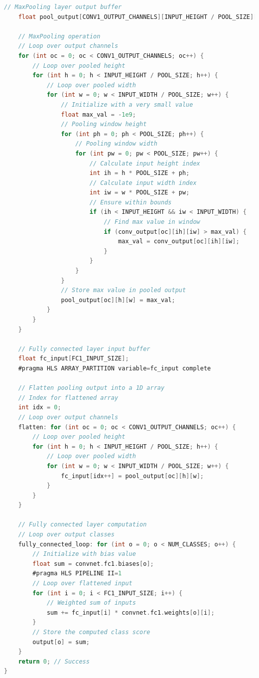 \documentclass{article}
\begin{document}
\begin{lstlisting}[language=C]
    // MaxPooling layer output buffer
    float pool_output[CONV1_OUTPUT_CHANNELS][INPUT_HEIGHT / POOL_SIZE][INPUT_WIDTH / POOL_SIZE];

    // MaxPooling operation
    // Loop over output channels
    for (int oc = 0; oc < CONV1_OUTPUT_CHANNELS; oc++) { 
        // Loop over pooled height
        for (int h = 0; h < INPUT_HEIGHT / POOL_SIZE; h++) { 
            // Loop over pooled width
            for (int w = 0; w < INPUT_WIDTH / POOL_SIZE; w++) { 
                // Initialize with a very small value
                float max_val = -1e9; 
                // Pooling window height
                for (int ph = 0; ph < POOL_SIZE; ph++) { 
                    // Pooling window width
                    for (int pw = 0; pw < POOL_SIZE; pw++) { 
                        // Calculate input height index
                        int ih = h * POOL_SIZE + ph; 
                        // Calculate input width index
                        int iw = w * POOL_SIZE + pw; 
                        // Ensure within bounds
                        if (ih < INPUT_HEIGHT && iw < INPUT_WIDTH) { 
                            // Find max value in window
                            if (conv_output[oc][ih][iw] > max_val) { 
                                max_val = conv_output[oc][ih][iw];
                            }
                        }
                    }
                }
                // Store max value in pooled output
                pool_output[oc][h][w] = max_val; 
            }
        }
    }

    // Fully connected layer input buffer
    float fc_input[FC1_INPUT_SIZE];
    #pragma HLS ARRAY_PARTITION variable=fc_input complete

    // Flatten pooling output into a 1D array
    // Index for flattened array
    int idx = 0; 
    // Loop over output channels
    flatten: for (int oc = 0; oc < CONV1_OUTPUT_CHANNELS; oc++) { 
        // Loop over pooled height
        for (int h = 0; h < INPUT_HEIGHT / POOL_SIZE; h++) { 
            // Loop over pooled width
            for (int w = 0; w < INPUT_WIDTH / POOL_SIZE; w++) { 
                fc_input[idx++] = pool_output[oc][h][w];
            }
        }
    }

    // Fully connected layer computation
    // Loop over output classes
    fully_connected_loop: for (int o = 0; o < NUM_CLASSES; o++) { 
        // Initialize with bias value
        float sum = convnet.fc1.biases[o]; 
        #pragma HLS PIPELINE II=1
        // Loop over flattened input
        for (int i = 0; i < FC1_INPUT_SIZE; i++) { 
            // Weighted sum of inputs
            sum += fc_input[i] * convnet.fc1.weights[o][i]; 
        }
        // Store the computed class score
        output[o] = sum; 
    }
    return 0; // Success
}
\end{lstlisting}
\end{document}
